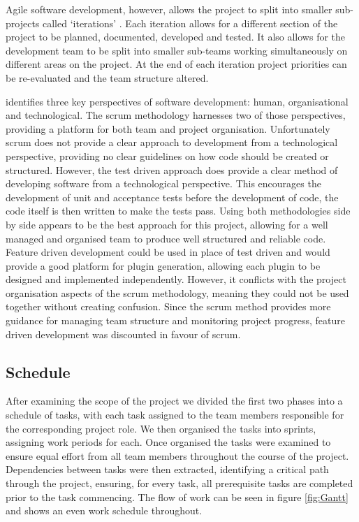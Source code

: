 \documentclass[10pt,a4paper]{article}
\begin{document}
Agile software development, however, allows the project to split into smaller
sub-projects called `iterations' \cite{hazzan2008agile}. Each iteration allows
for a different section of the project to be planned, documented, developed and
tested. It also allows for the development team to be split into smaller
sub-teams working simultaneously on different areas on the project. At the end
of each iteration project priorities can be re-evaluated and the team structure
altered. 

\cite{hazzan2008agile} identifies three key perspectives of software
development: human, organisational and technological. The scrum methodology
harnesses two of those perspectives, providing a platform for both team and
project organisation. Unfortunately scrum does not provide a clear approach to
development from a technological perspective, providing no clear guidelines on
how code should be created or structured. However, the test driven approach does
provide a clear method of developing software from a technological perspective.
This encourages the development of unit and acceptance tests before the
development of code, the code itself is then written to make the tests pass.
Using both methodologies side by side appears to be the best approach for this
project, allowing for a well managed and organised team to produce well
structured and reliable code. Feature driven development could be used in place
of test driven and would provide a good platform for plugin generation, allowing
each plugin to be designed and implemented independently. However, it conflicts
with the project organisation aspects of the scrum methodology, meaning they
could not be used together without creating confusion. Since the scrum method
provides more guidance for managing team structure and monitoring project
progress, feature driven development was discounted in favour of scrum.

\subsection{Schedule}
After examining the scope of the project we divided the first two phases into a schedule of tasks, with each task assigned to the team members responsible for the corresponding project role. We then organised the tasks into sprints, assigning work periods for each. Once organised the tasks were examined to ensure equal effort from all team members throughout the course of the project. Dependencies between tasks were then extracted, identifying a critical path through the project, ensuring, for every task, all prerequisite tasks are completed prior to the task commencing.  The flow of work can be seen in figure \ref{fig:Gantt} and shows an even work schedule throughout.
\end{document}
